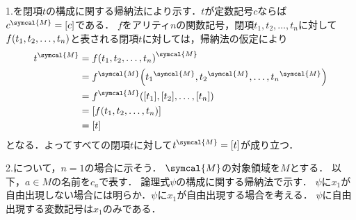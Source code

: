 \subsection*{}

1.を閉項\(t\)の構成に関する帰納法により示す．\(t\)が定数記号\(c\)ならば
\(\interpretation{\symcal{M}}{c} = \equivclass{c}\)である．
\(f\)をアリティ\(n\)の関数記号，閉項\(t_1, t_2, \dots, t_n\)に対して
\(\apply{f}{t_1, t_2, \dots, t_n}\)と表される閉項\(t\)に対しては，帰納法の仮定により
\begin{align*}
	\interpretation{\symcal{M}}{t} & = \interpretation{\symcal{M}}{\apply{f}{t_1, t_2, \dots, t_n}}                                                                                        \\
	                               & = \apply{\interpretation{\symcal{M}}{f}}{\interpretation{\symcal{M}}{t_1}, \interpretation{\symcal{M}}{t_2}, \dots, \interpretation{\symcal{M}}{t_n}} \\
	                               & = \apply{\interpretation{\symcal{M}}{f}}{\equivclass{t_1}, \equivclass{t_2}, \dots, \equivclass{t_n}}                                                 \\
	                               & = \equivclass{\apply{f}{t_1, t_2, \dots, t_n}}                                                                                                        \\
	                               & = \equivclass{t}
\end{align*}
となる．よってすべての閉項\(t\)に対して\(\interpretation{\symcal{M}}{t} = \equivclass{t}\)が成り立つ．

2.について，\(n = 1\)の場合に示そう．
\(\symcal{M}\)の対象領域を\(M\)とする．
以下，\(a \in M\)の名前を\(c_a\)で表す．
論理式\(\psi\)の構成に関する帰納法で示す．
\(\psi\)に\(x_1\)が自由出現しない場合には明らか．\(\psi\)に\(x_1\)が自由出現する場合を考える．
\(\psi\)に自由出現する変数記号は\(x_1\)のみである．

